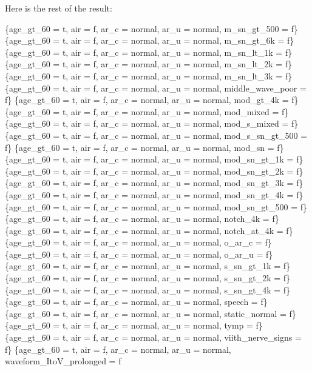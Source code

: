 \documentclass[12pt]{article}
\begin{document}
\begin{mdframed}

Here is the rest of the result:
\newline

    \{age\_gt\_60 = t, air = f, ar\_c = normal, ar\_u = normal, m\_sn\_gt\_500 = f\}
    \{age\_gt\_60 = t, air = f, ar\_c = normal, ar\_u = normal, m\_sn\_gt\_6k = f\}
    \{age\_gt\_60 = t, air = f, ar\_c = normal, ar\_u = normal, m\_sn\_lt\_1k = f\}
    \{age\_gt\_60 = t, air = f, ar\_c = normal, ar\_u = normal, m\_sn\_lt\_2k = f\}
    \{age\_gt\_60 = t, air = f, ar\_c = normal, ar\_u = normal, m\_sn\_lt\_3k = f\}
    \{age\_gt\_60 = t, air = f, ar\_c = normal, ar\_u = normal, middle\_wave\_poor = f\}
    \{age\_gt\_60 = t, air = f, ar\_c = normal, ar\_u = normal, mod\_gt\_4k = f\}
    \{age\_gt\_60 = t, air = f, ar\_c = normal, ar\_u = normal, mod\_mixed = f\}
    \{age\_gt\_60 = t, air = f, ar\_c = normal, ar\_u = normal, mod\_s\_mixed = f\}
    \{age\_gt\_60 = t, air = f, ar\_c = normal, ar\_u = normal, mod\_s\_sn\_gt\_500 = f\}
    \{age\_gt\_60 = t, air = f, ar\_c = normal, ar\_u = normal, mod\_sn = f\}
    \{age\_gt\_60 = t, air = f, ar\_c = normal, ar\_u = normal, mod\_sn\_gt\_1k = f\}
    \{age\_gt\_60 = t, air = f, ar\_c = normal, ar\_u = normal, mod\_sn\_gt\_2k = f\}
    \{age\_gt\_60 = t, air = f, ar\_c = normal, ar\_u = normal, mod\_sn\_gt\_3k = f\}
    \{age\_gt\_60 = t, air = f, ar\_c = normal, ar\_u = normal, mod\_sn\_gt\_4k = f\}
    \{age\_gt\_60 = t, air = f, ar\_c = normal, ar\_u = normal, mod\_sn\_gt\_500 = f\}
    \{age\_gt\_60 = t, air = f, ar\_c = normal, ar\_u = normal, notch\_4k = f\}
    \{age\_gt\_60 = t, air = f, ar\_c = normal, ar\_u = normal, notch\_at\_4k = f\}
    \{age\_gt\_60 = t, air = f, ar\_c = normal, ar\_u = normal, o\_ar\_c = f\}
    \{age\_gt\_60 = t, air = f, ar\_c = normal, ar\_u = normal, o\_ar\_u = f\}
    \{age\_gt\_60 = t, air = f, ar\_c = normal, ar\_u = normal, s\_sn\_gt\_1k = f\}
    \{age\_gt\_60 = t, air = f, ar\_c = normal, ar\_u = normal, s\_sn\_gt\_2k = f\}
    \{age\_gt\_60 = t, air = f, ar\_c = normal, ar\_u = normal, s\_sn\_gt\_4k = f\}
    \{age\_gt\_60 = t, air = f, ar\_c = normal, ar\_u = normal, speech = f\}
    \{age\_gt\_60 = t, air = f, ar\_c = normal, ar\_u = normal, static\_normal = f\}
    \{age\_gt\_60 = t, air = f, ar\_c = normal, ar\_u = normal, tymp = f\}
    \{age\_gt\_60 = t, air = f, ar\_c = normal, ar\_u = normal, viith\_nerve\_signs = f\}
    \{age\_gt\_60 = t, air = f, ar\_c = normal, ar\_u = normal, waveform\_ItoV\_prolonged = f
\end{mdframed}
\end{document}
